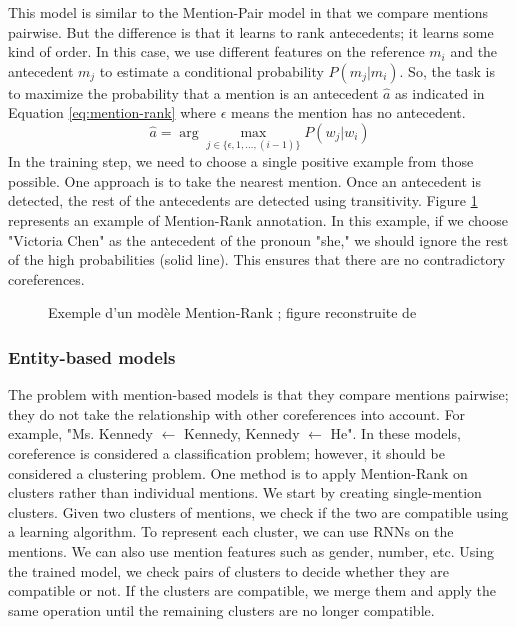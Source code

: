 \documentclass{KBook}
\begin{document}
This model is similar to the Mention-Pair model in that we compare mentions pairwise. 
But the difference is that it learns to rank antecedents; it learns some kind of order. 
In this case, we use different features on the reference $m_i$ and the antecedent $m_j$ to estimate a conditional probability $P(m_j|m_i)$.
So, the task is to maximize the probability that a mention is an antecedent $\hat{a}$ as indicated in Equation \ref{eq:mention-rank} where $\epsilon$ means the mention has no antecedent. 
\begin{equation}\label{eq:mention-rank}
	\hat{a} = \arg\max_{j \in \{\epsilon, 1, \ldots, (i-1)\}} P(w_j|w_i) 
\end{equation}
In the training step, we need to choose a single positive example from those possible. 
One approach is to take the nearest mention.
Once an antecedent is detected, the rest of the antecedents are detected using transitivity. 
Figure \ref{fig:mention-rank-exp} represents an example of Mention-Rank annotation.
In this example, if we choose "Victoria Chen" as the antecedent of the pronoun "she," we should ignore the rest of the high probabilities (solid line).
This ensures that there are no contradictory coreferences.
\begin{figure}[ht]
	\centering
	\caption[Exemple d'un modèle Mention-Rank]{Exemple d'un modèle Mention-Rank ; figure reconstruite de \cite{2019-jurafsky-martin}}
	\label{fig:mention-rank-exp}
\end{figure}



\subsubsection{Entity-based models}

The problem with mention-based models is that they compare mentions pairwise; they do not take the relationship with other coreferences into account.
For example, "Ms. Kennedy $ \leftarrow $ Kennedy, Kennedy $ \leftarrow $ He".
In these models, coreference is considered a classification problem; however, it should be considered a clustering problem.
One method is to apply Mention-Rank on clusters rather than individual mentions.
We start by creating single-mention clusters.
Given two clusters of mentions, we check if the two are compatible using a learning algorithm.
To represent each cluster, we can use RNNs on the mentions.
We can also use mention features such as gender, number, etc.
Using the trained model, we check pairs of clusters to decide whether they are compatible or not.
If the clusters are compatible, we merge them and apply the same operation until the remaining clusters are no longer compatible.
\end{document}
